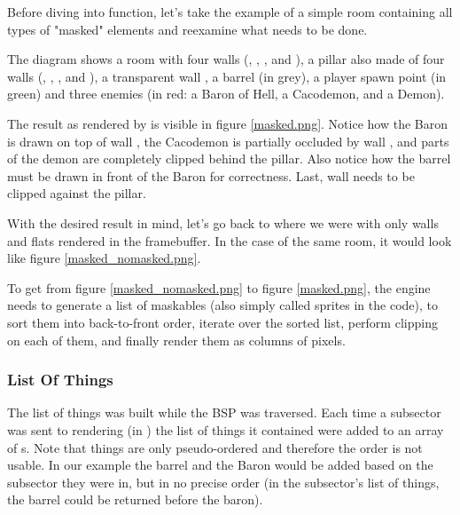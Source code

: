 Before diving into  function, let's take the example of a simple room containing all types of "masked" elements and reexamine what needs to be done.\\
\par
The diagram shows a room with four walls (, , , and ), a pillar also made of four walls (, , , and ), a transparent wall , a barrel (in grey), a player spawn point (in green) and three enemies (in red: a Baron of Hell, a Cacodemon, and a Demon).\\
\par
The result as rendered by \doom{} is visible in figure \ref{masked.png}. Notice how the Baron is drawn on top of wall , the Cacodemon is partially occluded by wall , and parts of the demon are completely clipped behind the pillar. Also notice how the barrel must be drawn in front of the Baron for correctness. Last, wall  needs to be clipped against the pillar.\\
\par
{}
\par
With the desired result in mind, let's go back to where we were with only walls and flats rendered in the framebuffer. In the case of the same room, it would look like figure \ref{masked_nomasked.png}.\\
\par
{}
\par
To get from figure \ref{masked_nomasked.png} to figure \ref{masked.png}, the engine needs to generate a list of maskables (also simply called sprites in the code), to sort them into back-to-front order, iterate over the sorted list, perform clipping on each of them, and finally render them as columns of pixels.\\
\par
\subsubsection{List Of Things}
 The list of things was built while the BSP was traversed. Each time a subsector was sent to rendering (in ) the list of things it contained were added to an array of s. Note that things are only pseudo-ordered and therefore the order is not usable. In our example the barrel and the Baron would be added based on the subsector they were in, but in no precise order (in the subsector's list of things, the barrel could be returned before the baron).\\
 \par
